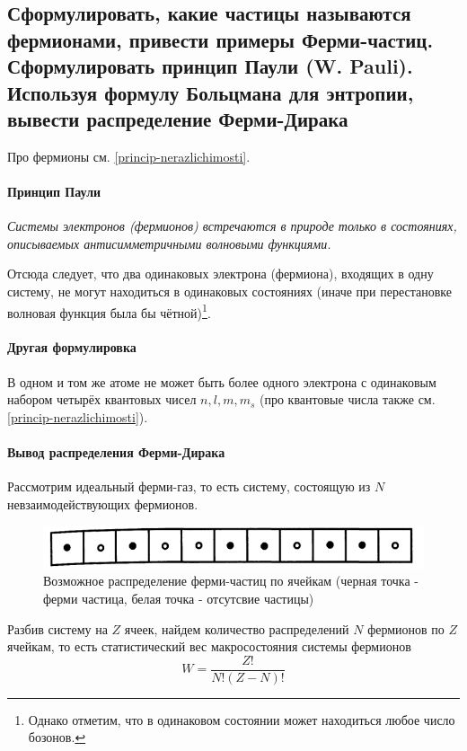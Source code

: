 \subsection{Сформулировать, какие частицы называются фермионами, привести примеры Ферми-частиц.
Сформулировать принцип Паули (W. Pauli). Используя формулу Больцмана для энтропии, вывести
распределение Ферми-Дирака}

Про фермионы см. \ref{princip-nerazlichimosti}.

\paragraph{Принцип Паули}
\textit{Системы электронов (фермионов) встречаются в природе только в состояниях, описываемых антисимметричными волновыми функциями. }

Отсюда следует, что два одинаковых электрона (фермиона), входящих в одну систему, не могут находиться в одинаковых состояниях (иначе при перестановке волновая функция была бы чётной)\footnote{Однако отметим, что в одинаковом состоянии может находиться любое число бозонов.}.

\paragraph{Другая формулировка} В одном и том же атоме не может быть более одного электрона с одинаковым набором четырёх квантовых чисел $n, l , m, m_s$ (про квантовые числа также см. \ref{princip-nerazlichimosti}).

\paragraph{Вывод распределения Ферми-Дирака}
Рассмотрим идеальный ферми-газ, то есть систему, состоящую из $N$ невзаимодействующих фермионов.
\begin{figure}[H]
	\centering
	\includegraphics[width=0.7\linewidth]{img/write-05/yacheiki}
	\caption{Возможное распределение ферми-частиц по ячейкам (черная точка - ферми частица, белая точка - отсутсвие частицы)}
	\label{fig:yacheiki}
\end{figure}
Разбив систему на $Z$ ячеек, найдем количество распределений $N$ фермионов по $Z$ ячейкам, то есть статистический вес макросостояния системы фермионов
\begin{equation*}
	W = \frac{Z!}{N!(Z-N)!}
\end{equation*}

